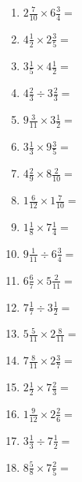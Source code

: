 \documentclass[12pt]{article}
\begin{document}
\begin{enumerate}
\item \large $ 2 \frac{7}{10} \times 6 \frac{3}{4} = $ \vspace{1.6cm}
\item \large $ 4 \frac{1}{2} \times 2 \frac{3}{5} = $ \vspace{1.6cm}
\item \large $ 3 \frac{1}{5} \times 4 \frac{1}{2} = $ \vspace{1.6cm}
\item \large $ 4 \frac{2}{3} \div 3 \frac{2}{3} = $ \vspace{1.6cm}
\newpage
\item \large $ 9 \frac{3}{11} \times 3 \frac{1}{2} = $ \vspace{1.6cm}
\item \large $ 3 \frac{1}{3} \times 9 \frac{3}{5} = $ \vspace{1.6cm}
\item \large $ 4 \frac{2}{9} \times 8 \frac{2}{10} = $ \vspace{1.6cm}
\item \large $ 1 \frac{6}{12} \times 1 \frac{7}{10} = $ \vspace{1.6cm}
\item \large $ 1 \frac{1}{8} \times 7 \frac{1}{4} = $ \vspace{1.6cm}
\item \large $ 9 \frac{1}{11} \div 6 \frac{3}{4} = $ \vspace{1.6cm}
\item \large $ 6 \frac{6}{7} \times 5 \frac{2}{11} = $ \vspace{1.6cm}
\item \large $ 7 \frac{1}{7} \div 3 \frac{1}{2} = $ \vspace{1.6cm}
\item \large $ 5 \frac{5}{11} \times 2 \frac{8}{11} = $ \vspace{1.6cm}
\item \large $ 7 \frac{8}{11} \times 2 \frac{3}{7} = $ \vspace{1.6cm}
\newpage
\item \large $ 2 \frac{1}{2} \times 7 \frac{2}{3} = $ \vspace{1.6cm}
\item \large $ 1 \frac{9}{12} \times 2 \frac{2}{6} = $ \vspace{1.6cm}
\item \large $ 3 \frac{1}{3} \div 7 \frac{1}{2} = $ \vspace{1.6cm}
\item \large $ 8 \frac{5}{8} \times 7 \frac{2}{5} = $ \vspace{1.6cm}

\end{enumerate}
\end{document}
